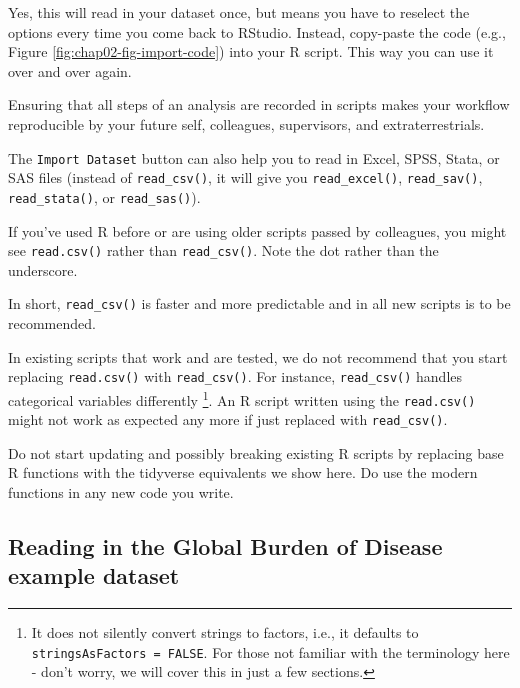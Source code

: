 \documentclass[
  12pt,
  krantz2]{krantz}
\renewenvironment{quote}{\begin{VF}}{\end{VF}}
\begin{document}
Yes, this will read in your dataset once, but means you have to reselect the options every time you come back to RStudio.
Instead, copy-paste the code (e.g., Figure \ref{fig:chap02-fig-import-code}) into your R script.
This way you can use it over and over again.

Ensuring that all steps of an analysis are recorded in scripts makes your workflow reproducible by your future self, colleagues, supervisors, and extraterrestrials.

\begin{quote}
The \texttt{Import\ Dataset} button can also help you to read in Excel, SPSS, Stata, or SAS files (instead of \texttt{read\_csv()}, it will give you \texttt{read\_excel()}, \texttt{read\_sav()}, \texttt{read\_stata()}, or \texttt{read\_sas()}).
\end{quote}

If you've used R before or are using older scripts passed by colleagues, you might see \texttt{read.csv()} rather than \texttt{read\_csv()}.
Note the dot rather than the underscore.

In short, \texttt{read\_csv()} is faster and more predictable and in all new scripts is to be recommended.

In existing scripts that work and are tested, we do not recommend that you start replacing \texttt{read.csv()} with \texttt{read\_csv()}.
For instance, \texttt{read\_csv()} handles categorical variables differently \footnote{It does not silently convert strings to factors, i.e., it defaults to \texttt{stringsAsFactors\ =\ FALSE}. For those not familiar with the terminology here - don't worry, we will cover this in just a few sections.}.
An R script written using the \texttt{read.csv()} might not work as expected any more if just replaced with \texttt{read\_csv()}.

\begin{quote}
Do not start updating and possibly breaking existing R scripts by replacing base R functions with the tidyverse equivalents we show here. Do use the modern functions in any new code you write.
\end{quote}

\hypertarget{reading-in-the-global-burden-of-disease-example-dataset}{%
\subsection{Reading in the Global Burden of Disease example dataset}\label{reading-in-the-global-burden-of-disease-example-dataset}}
\end{document}
